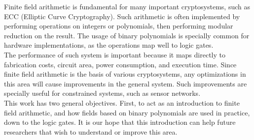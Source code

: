 

Finite field arithmetic is fundamental for many important cryptosystems, such as ECC (Elliptic Curve Cryptography). Such arithmetic is often implemented by performing operations on integers or polynomials, then performing modular reduction on the result. The usage of binary polynomials is specially common for hardware implementations, as the operations map well to logic gates. \\

The performance of such system is important because it maps directly to fabrication costs, circuit area, power consumption, and execution time. Since finite field arithmetic is the basis of various cryptosystems, any optimizations in this area will cause improvements in the general system. Such improvements are specially useful for constrained systems, such as sensor networks. \\

This work has two general objectives. First, to act as an introduction to finite field arithmetic, and how fields based on binary polynomials are used in practice, down to the logic gates. It is our hope that this introduction can help future researchers that wish to understand or improve this area. \\


